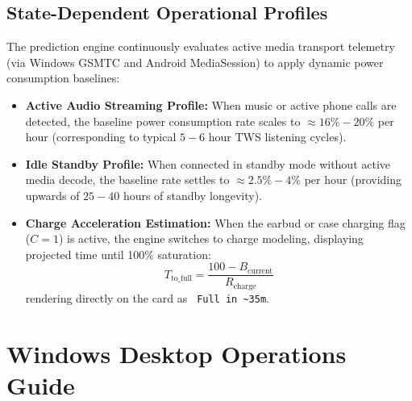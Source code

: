 \documentclass[11pt,a4paper]{article}
\begin{document}
\subsection{State-Dependent Operational Profiles}

The prediction engine continuously evaluates active media transport telemetry (via Windows GSMTC and Android MediaSession) to apply dynamic power consumption baselines:
\begin{itemize}
    \item \textbf{Active Audio Streaming Profile:} When music or active phone calls are detected, the baseline power consumption rate scales to $\approx 16\% - 20\%$ per hour (corresponding to typical $5 - 6$ hour TWS listening cycles).
    \item \textbf{Idle Standby Profile:} When connected in standby mode without active media decode, the baseline rate settles to $\approx 2.5\% - 4\%$ per hour (providing upwards of $25 - 40$ hours of standby longevity).
    \item \textbf{Charge Acceleration Estimation:} When the earbud or case charging flag ($C = 1$) is active, the engine switches to charge modeling, displaying projected time until 100\% saturation:
    \begin{equation}
        T_{\text{to\_full}} = \frac{100 - B_{\text{current}}}{R_{\text{charge}}}
    \end{equation}
    rendering directly on the card as \texttt{\lightning{} Full in \~{}35m}.
\end{itemize}

\section{Windows Desktop Operations Guide}
\end{document}
